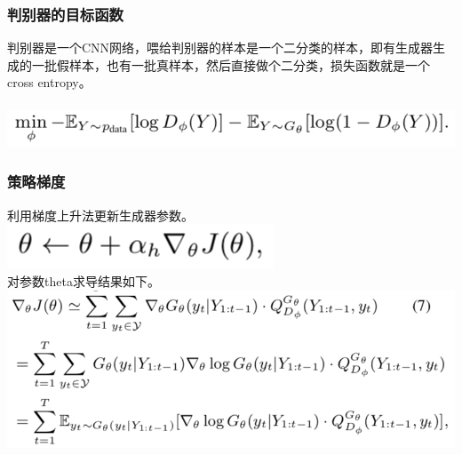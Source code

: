 \documentclass[11pt,a4paper]{ctexart}
\begin{document}
\subsubsection{判别器的目标函数}
\noindent 判别器是一个CNN网络，喂给判别器的样本是一个二分类的样本，即有生成器生成的一批假样本，也有一批真样本，然后直接做个二分类，损失函数就是一个cross entropy。\\\\
\includegraphics[scale=1]{6.png}
\subsubsection{策略梯度}
\noindent 利用梯度上升法更新生成器参数。\\
\includegraphics[scale=1]{0.png}\\
\noindent 对参数theta求导结果如下。\\
\includegraphics[scale=1]{7.png}
\end{document}
